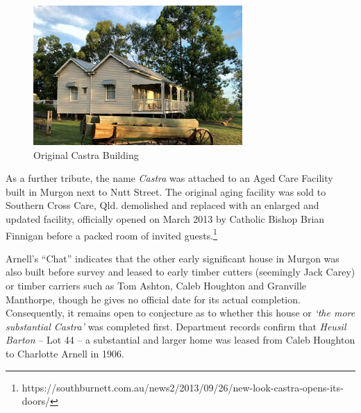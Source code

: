 \begin{figure}
\begin{center}
\includegraphics[width=1.\linewidth,center]{../images/castraOld.png}
\caption{Original Castra Building}
\end{center}
\end{figure}




As a further tribute, the name \emph{Castra} was attached to an Aged Care Facility built in Murgon next to Nutt Street. The original aging facility was sold to Southern Cross Care, Qld. demolished and replaced with an enlarged and updated facility, officially opened on March 2013 by Catholic Bishop Brian Finnigan before a packed room of invited guests.\footnote{https://southburnett.com.au/news2/2013/09/26/new-look-castra-opens-its-doors/}


Arnell's ``Chat'' indicates that the other early significant house in Murgon was also built before survey and leased to early timber cutters (seemingly Jack Carey) or timber carriers such as Tom Ashton, Caleb Houghton and Granville Manthorpe, though he gives no official date for its actual completion. Consequently, it remains open to conjecture as to whether this house or \emph{`the more substantial Castra'} was completed first. Department records confirm that \emph{Heusil Barton} -- Lot 44 -- a substantial and larger home was leased from Caleb Houghton to Charlotte Arnell in 1906.



